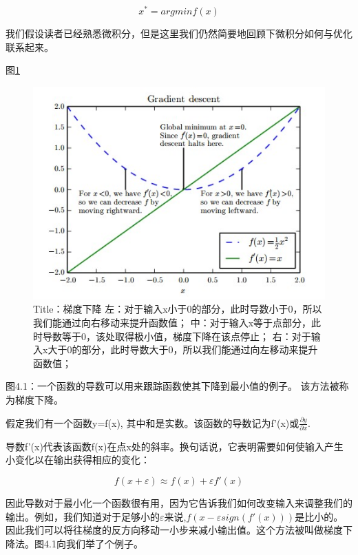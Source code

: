 \begin{equation}
x^*=argminf(x)
\end{equation}

我们假设读者已经熟悉微积分，但是这里我们仍然简要地回顾下微积分如何与优化联系起来。

图\ref{fig:4_1}
\begin{figure}[htbp] %
   \centering
   \includegraphics[width=6in]{fig/chap4/4_1.jpg} 
   \caption{Title：梯度下降
左：对于输入x小于0的部分，此时导数小于0，所以我们能通过向右移动来提升函数值；
中：对于输入x等于点部分，此时导数等于0，该处取得极小值，梯度下降在该点停止；
右：对于输入x大于0的部分，此时导数大于0，所以我们能通过向左移动来提升函数值；}
   \label{fig:4_1}
\end{figure}

图4.1：一个函数的导数可以用来跟踪函数使其下降到最小值的例子。 该方法被称为梯度下降。

假定我们有一个函数y=f(x), 其中和是实数。该函数的导数记为f'(x)或$\frac{\partial y}{\partial x}$.

导数f'(x)代表该函数f(x)在点x处的斜率。换句话说，它表明需要如何使输入产生小变化以在输出获得相应的变化：

\begin{equation}
f(x+\varepsilon)\approx f(x)+\varepsilon f'(x)
\end{equation}

因此导数对于最小化一个函数很有用，因为它告诉我们如何改变输入来调整我们的输出。例如，我们知道对于足够小的$\varepsilon$来说,$ f(x-\varepsilon sign(f'(x)))$是比小的。因此我们可以将往梯度的反方向移动一小步来减小输出值。这个方法被叫做梯度下降法。图4.1向我们举了个例子。

